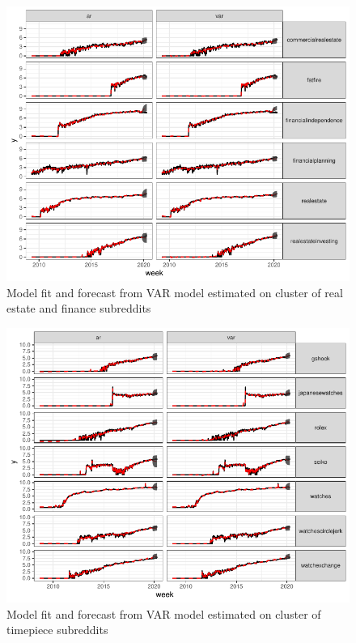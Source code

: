 \documentclass[manuscript]{acmart}\usepackage[]{graphicx}\usepackage[]{color}
\makeatletter
\def\maxwidth{ %
  \ifdim\Gin@nat@width>\linewidth
    \linewidth
  \else
    \Gin@nat@width
  \fi
}
\makeatother
\begin{document}
\begin{figure}
\centering

\includegraphics[width=\maxwidth]{figures/knitr-comp_fcast-1} 

\caption{Model fit and forecast from VAR model estimated on cluster of real estate and finance subreddits} 
\end{figure}

\begin{figure}
\centering

\includegraphics[width=\maxwidth]{figures/knitr-mixed_fcast-1} 

\caption{Model fit and forecast from VAR model estimated on cluster of timepiece subreddits} 
\end{figure}
\end{document}
